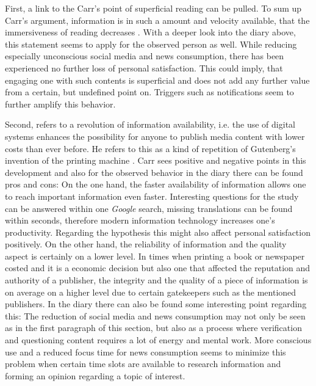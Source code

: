 First, a link to the Carr's point of superficial reading can be pulled. To sum up Carr's argument, information is in such a amount and velocity available, that the immersiveness of reading decreases \citep{Carr.2008}. With a deeper look into the diary above, this statement seems to apply for the observed person as well. While reducing especially unconscious social media and news consumption, there has been experienced no further loss of personal satisfaction. This could imply, that engaging one with such contents is superficial and does not add any further value from a certain, but undefined point on. Triggers such as notifications seem to further amplify this behavior.

Second, \cite{Carr.2008} refers to a revolution of information availability, i.e. the use of digital systems enhances the possibility for anyone to publish media content with lower costs than ever before. He refers to this as a kind of repetition of Gutenberg's invention of the printing machine \citep{Carr.2008}. Carr sees positive and negative points in this development and also for the observed behavior in the diary there can be found pros and cons: On the one hand, the faster availability of information allows one to reach important information even faster. Interesting questions for the study can be answered within one \textit{Google} search, missing translations can be found within seconds, therefore modern information technology increases one's productivity. Regarding the hypothesis this might also affect personal satisfaction positively. On the other hand, the reliability of information and the quality aspect is certainly on a lower level. In times when printing a book or newspaper costed and it is a economic decision but also one that affected the reputation and authority of a publisher, the integrity and the quality of a piece of information is on average on a higher level due to certain gatekeepers such as the mentioned publishers. In the diary there can also be found some interesting point regarding this: The reduction of social media and news consumption may not only be seen as in the first paragraph of this section, but also as a process where verification and questioning content requires a lot of energy and mental work. More conscious use and a reduced focus time for news consumption seems to minimize this problem when certain time slots are available to research information and forming an opinion regarding a topic of interest.

